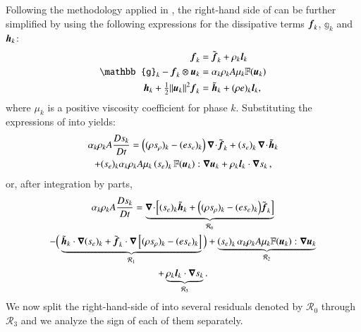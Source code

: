 \documentclass[preprint,10pt]{elsarticle}
\begin{document}
%
%
Following the methodology applied in \cite{jlg, Marco_paper_low_mach}, the right-hand side of 
 can be further simplified by using the following expressions
for the dissipative terms $\boldsymbol f_k$,  $\mathbb{g}_k$ and $\boldsymbol h_k$:
%
\begin{subequations}\label{eq:def-diss-terms-sect4}
\begin{align}
  \mbold f_k   &= \tilde{\mbold f}_k +\rho_k \mbold  l_k
  \\
  \mathbb{g}_k -  \mbold f_k \otimes \mbold u_k &= \alpha_k \rho_k A \mu_k \mathbb{F}(\mbold u_k) 
  \\
  \mbold h_k + \tfrac{1}{2}\| \mbold u_k\|^2  \mbold f_k &= \tilde{\mbold h}_k + (\rho e)_k \mbold l_k,
\end{align}
\end{subequations}
%
where $\mu_k$ is a positive viscosity coefficient for phase $k$. %
Substituting the expressions of  into  yields:
%
\begin{multline}\label{eq:ent-res-7-eqn-diss-terms_rearranged2}
\alpha_k \rho_k A \frac{Ds_k}{Dt} 
=  \left( (\rho s_\rho)_k - (e s_e)_k \right) \boldsymbol\nabla\! \cdot \! \tilde{\boldsymbol f}_k 
+ \left(s_e\right)_k \boldsymbol\nabla\! \cdot \! \tilde{ \boldsymbol h} _k \\
+ (s_e)_k \alpha_k \rho_k A \mu_k  \left(s_e\right)_k \mathbb{F}(\boldsymbol u_k) : \boldsymbol\nabla \boldsymbol u_k 
+ \rho_k \boldsymbol l _k \cdot \boldsymbol\nabla s_k \,,
\end{multline}
%
or, after integration by parts,
%
\begin{multline}\label{eq:ent-res-7-eqn-diss-terms2}
\alpha_k \rho_k A \frac{Ds_k}{Dt} = 
\underbrace{\boldsymbol\nabla\! \cdot \! \left[ (s_e)_k\tilde{\boldsymbol h}_k +\Big( (\rho s_\rho)_k - (e s_e)_k \Big) \tilde{\boldsymbol f}_k \right]}_{{\mathcal{R}_0}} \\
-\Big(
\underbrace{\tilde{\boldsymbol h}_k \cdot \boldsymbol\nabla (s_e)_k + \tilde{\boldsymbol f}_k \cdot \boldsymbol\nabla \left[  (\rho s_\rho)_k - (e s_e)_k \right]}_{\mathcal{R}_1} 
\Big)
+ \underbrace{ \left(s_e\right)_k \alpha_k \rho_k A \mu_k \mathbb{F}(\boldsymbol u_k) : \boldsymbol\nabla \boldsymbol u_k}_{\mathcal{R}_2} \\
+ \underbrace{\rho_k \boldsymbol l _k \cdot \boldsymbol\nabla s_k}_{\mathcal{R}_3}.
\end{multline}
%
We now split the right-hand-side of  into several residuals denoted by $\mathcal{R}_0$ through $\mathcal{R}_3$ and we analyze the sign of each of them separately. 
\end{document}

